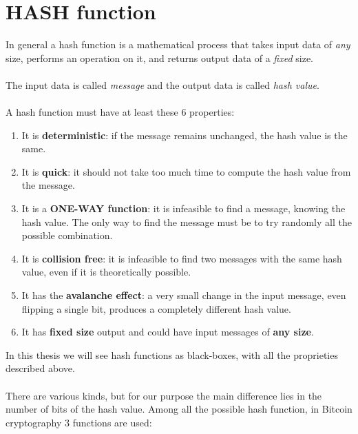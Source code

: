 \section{HASH function}
In general a hash function is a mathematical process that takes input data of \textit{any} size, performs an operation on it, and returns output data of a \textit{fixed} size.
\\ \\
The input data is called \textit{message} and the output data is called \textit{hash value}. 
\\ \\
A hash function must have at least these 6 properties:
\begin{enumerate}[label=(\roman*)]
	\item It is \textbf{deterministic}: if the message remains unchanged, the hash value is the same.
	\item It is \textbf{quick}: it should not take too much time to compute the hash value from the message.
	\item It is a \textbf{ONE-WAY function}: it is infeasible to find a message, knowing the hash value. The only way to find the message must be to try randomly all the possible combination.
	\item It is \textbf{collision free}: it is infeasible to find two messages with the same hash value, even if it is theoretically possible.
	\item It has the \textbf{avalanche effect}: a very small change in the input message, even flipping a single bit, produces a completely different hash value.
	\item It has \textbf{fixed size} output and could have input messages of \textbf{any size}.
\end{enumerate}
In this thesis we will see hash functions as black-boxes, with all the proprieties described above. 
\\ \\
There are various kinds, but for our purpose the main difference lies in the number of bits of the hash value. Among all the possible hash function, in Bitcoin cryptography 3 functions are used:
